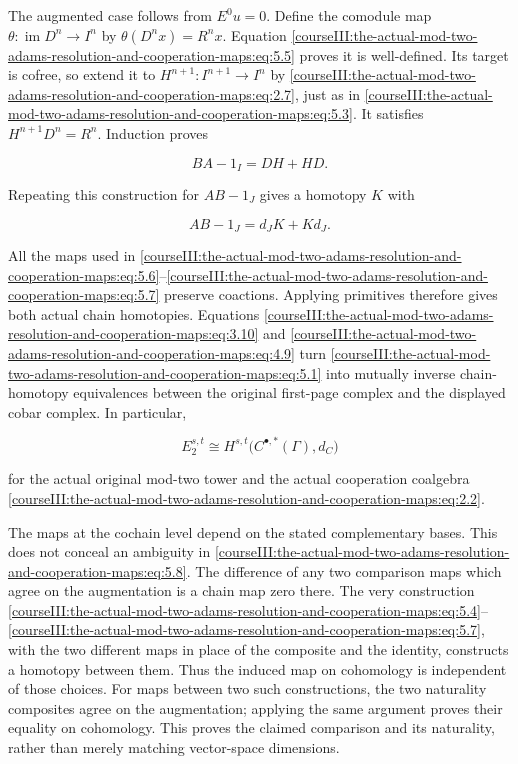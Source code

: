 The augmented case follows from \(E^0u=0\). Define the comodule map \(\theta:\operatorname{im}D^n\to I^n\) by \(\theta(D^nx)=R^nx\). Equation \eqref{courseIII:the-actual-mod-two-adams-resolution-and-cooperation-maps:eq:5.5} proves it is well-defined. Its target is cofree, so extend it to \(H^{n+1}:I^{n+1}\to I^n\) by \eqref{courseIII:the-actual-mod-two-adams-resolution-and-cooperation-maps:eq:2.7}, just as in \eqref{courseIII:the-actual-mod-two-adams-resolution-and-cooperation-maps:eq:5.3}. It satisfies \(H^{n+1}D^n=R^n\). Induction proves

\begin{equation}
BA-1_I=DH+HD.
 \label{courseIII:the-actual-mod-two-adams-resolution-and-cooperation-maps:eq:5.6}
\end{equation}

Repeating this construction for \(AB-1_J\) gives a homotopy \(K\) with

\begin{equation}
AB-1_J=d_JK+Kd_J.
 \label{courseIII:the-actual-mod-two-adams-resolution-and-cooperation-maps:eq:5.7}
\end{equation}

All the maps used in \eqref{courseIII:the-actual-mod-two-adams-resolution-and-cooperation-maps:eq:5.6}--\eqref{courseIII:the-actual-mod-two-adams-resolution-and-cooperation-maps:eq:5.7} preserve coactions. Applying primitives therefore gives both actual chain homotopies. Equations \eqref{courseIII:the-actual-mod-two-adams-resolution-and-cooperation-maps:eq:3.10} and \eqref{courseIII:the-actual-mod-two-adams-resolution-and-cooperation-maps:eq:4.9} turn \eqref{courseIII:the-actual-mod-two-adams-resolution-and-cooperation-maps:eq:5.1} into mutually inverse chain-homotopy equivalences between the original first-page complex and the displayed cobar complex. In particular,

\begin{equation}
E_2^{s,t}\cong H^{s,t}\bigl(C^{\bullet,*}(\Gamma),d_C\bigr)
 \label{courseIII:the-actual-mod-two-adams-resolution-and-cooperation-maps:eq:5.8}
\end{equation}

for the actual original mod-two tower and the actual cooperation coalgebra \eqref{courseIII:the-actual-mod-two-adams-resolution-and-cooperation-maps:eq:2.2}.

The maps at the cochain level depend on the stated complementary bases. This does not conceal an ambiguity in \eqref{courseIII:the-actual-mod-two-adams-resolution-and-cooperation-maps:eq:5.8}. The difference of any two comparison maps which agree on the augmentation is a chain map zero there. The very construction \eqref{courseIII:the-actual-mod-two-adams-resolution-and-cooperation-maps:eq:5.4}--\eqref{courseIII:the-actual-mod-two-adams-resolution-and-cooperation-maps:eq:5.7}, with the two different maps in place of the composite and the identity, constructs a homotopy between them. Thus the induced map on cohomology is independent of those choices. For maps between two such constructions, the two naturality composites agree on the augmentation; applying the same argument proves their equality on cohomology. This proves the claimed comparison and its naturality, rather than merely matching vector-space dimensions.

